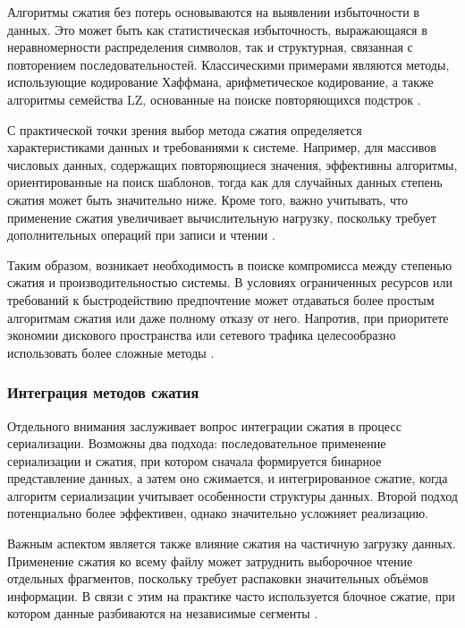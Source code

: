 \documentclass[coursework]{SCWorks}
\begin{document}
Алгоритмы сжатия без потерь основываются на выявлении избыточности в данных. Это может быть как статистическая избыточность, выражающаяся в неравномерности распределения символов, так и структурная, связанная с повторением последовательностей. Классическими примерами являются методы, использующие кодирование Хаффмана, арифметическое кодирование, а также алгоритмы семейства LZ, основанные на поиске повторяющихся подстрок \cite{salomon2007data, sayood2017introduction, mackay2003information}.

С практической точки зрения выбор метода сжатия определяется характеристиками данных и требованиями к системе. Например, для массивов числовых данных, содержащих повторяющиеся значения, эффективны алгоритмы, ориентированные на поиск шаблонов, тогда как для случайных данных степень сжатия может быть значительно ниже. Кроме того, важно учитывать, что применение сжатия увеличивает вычислительную нагрузку, поскольку требует дополнительных операций при записи и чтении \cite{gregg2013systems}.

Таким образом, возникает необходимость в поиске компромисса между степенью сжатия и производительностью системы. В условиях ограниченных ресурсов или требований к быстродействию предпочтение может отдаваться более простым алгоритмам сжатия или даже полному отказу от него. Напротив, при приоритете экономии дискового пространства или сетевого трафика целесообразно использовать более сложные методы \cite{kleppmann2017designing}.

\subsubsection{Интеграция методов сжатия}
Отдельного внимания заслуживает вопрос интеграции сжатия в процесс сериализации. Возможны два подхода: последовательное применение сериализации и сжатия, при котором сначала формируется бинарное представление данных, а затем оно сжимается, и интегрированное сжатие, когда алгоритм сериализации учитывает особенности структуры данных. Второй подход потенциально более эффективен, однако значительно усложняет реализацию.

Важным аспектом является также влияние сжатия на частичную загрузку данных. Применение сжатия ко всему файлу может затруднить выборочное чтение отдельных фрагментов, поскольку требует распаковки значительных объёмов информации. В связи с этим на практике часто используется блочное сжатие, при котором данные разбиваются на независимые сегменты \cite{salomon2007data}.
\end{document}
